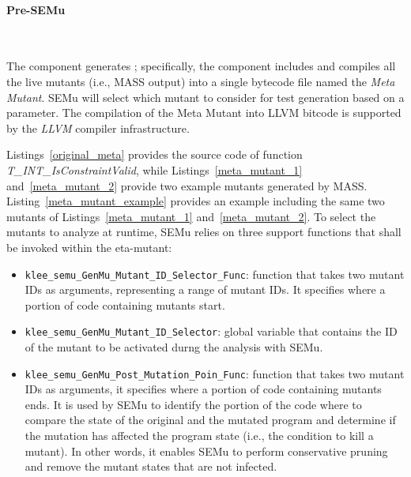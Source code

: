 




\paragraph{Pre-SEMu}\ 

The  component generates ; specifically, the component includes and compiles all the live mutants (i.e., MASS output) into a single bytecode file named the \emph{Meta Mutant}. SEMu will select which mutant to consider for test generation based on a parameter. The compilation of the Meta Mutant into LLVM bitcode is supported by the \emph{LLVM} compiler infrastructure. 



Listings~\ref{original_meta} provides the source code of function \emph{T\_INT\_IsConstraintValid}, while Listings~\ref{meta_mutant_1} and~\ref{meta_mutant_2} provide two example mutants generated by MASS.
Listing~\ref{meta_mutant_example} provides an example  including the same two mutants of Listings~\ref{meta_mutant_1} and~\ref{meta_mutant_2}. 
To select the mutants to analyze at runtime, SEMu relies on three support functions that shall be invoked within the eta-mutant:

\begin{itemize}
	\item \texttt{klee\_semu\_GenMu\_Mutant\_ID\_Selector\_Func}: function that takes two mutant IDs as arguments, representing a range of mutant IDs. It specifies where a portion of code containing mutants start.
    \item \texttt{klee\_semu\_GenMu\_Mutant\_ID\_Selector}: global variable that contains the ID of the mutant to be activated durng the analysis with SEMu.
	\item \texttt{klee\_semu\_GenMu\_Post\_Mutation\_Poin\_Func}: 
	function that takes two mutant IDs as arguments, it specifies where a portion of code containing mutants ends.
	It is used by SEMu to identify the portion of the code where to compare the state of the original and the mutated program and determine if the mutation has affected the program state (i.e., the  condition to kill a mutant). In other words, it enables SEMu to perform conservative pruning and remove the mutant states that are not infected.
\end{itemize}

